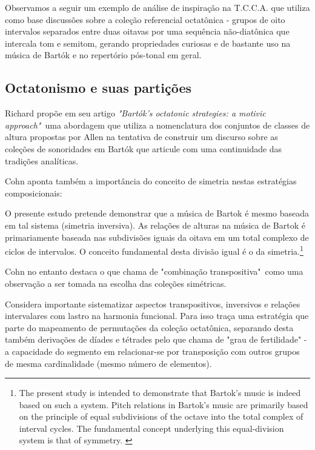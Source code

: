\documentclass[
	12pt,				%
	openright,			%
	twoside,			%
	a4paper,			%
	english,			%
	french,				%
	spanish,			%
	brazil				%
	]{abntex2}
\begin{document}
Observamos a seguir um exemplo de análise de inspiração na T.C.C.A. que utiliza como base discussões sobre a coleção referencial octatônica - grupos de oito intervalos separados entre duas oitavas por uma sequência não-diatônica que intercala tom e semitom, gerando propriedades curiosas e de bastante uso na música de Bartók e no repertório pós-tonal em geral.


\subsection{Octatonismo e suas partições}
\label{octa}

Richard  propõe em seu artigo \textit{"Bartók's octatonic strategies: a motivic approach"}\ uma abordagem que utiliza a nomenclatura dos conjuntos de classes de altura propostas por Allen  na tentativa de construir um discurso sobre as coleções de sonoridades em Bartók que articule com uma continuidade das tradições analíticas.

Cohn aponta também a importância do conceito de simetria nestas estratégias composicionais:

\begin{citacao}
O presente estudo pretende demonstrar que a música de Bartok é mesmo baseada em tal sistema (simetria inversiva). As relações de alturas na música de Bartok é primariamente baseada nas subdivisões iguais da oitava em um total complexo de ciclos de intervalos. O conceito fundamental desta divisão igual é o da simetria.\cite{cohn1988inversional}\footnote{ The present study is intended to demonstrate that Bartok's music is indeed based on such a system. Pitch relations in Bartok's music are primarily based on the principle of equal subdivisions of the octave into the total complex of interval cycles. The fundamental concept underlying this equal-division system is that of symmetry. \cite{cohn1988inversional}}
\end{citacao}

Cohn no entanto destaca o que chama de "combinação transpositiva"\ como uma observação a ser tomada na escolha das coleções simétricas.

Considera importante sistematizar aspectos transpositivos, inversivos e relações intervalares com lastro na harmonia funcional. Para isso traça uma estratégia que parte do mapeamento de permutações da coleção octatônica, separando desta também derivações de díades e tétrades pelo que chama de "grau de fertilidade"\cite[p. 268]{cohn1991bartok} - a capacidade do segmento em relacionar-se por transposição com outros grupos de mesma cardinalidade (mesmo número de elementos).
\end{document}

